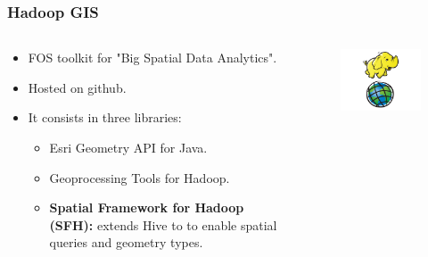\documentclass[hyperref={pdfpagelabels=true}]{beamer}
\begin{document}
\begin{frame}
\frametitle{Hadoop GIS}
\begin{columns}
  \begin{column}{0.5\textwidth}
   \begin{itemize}  
    \item<1->FOS toolkit for "Big Spatial Data Analytics".%
    \item<2->Hosted on github.
    \item<3->It consists in three libraries:
   \begin{itemize}    
      \item<4->Esri Geometry API for Java.
      \item<4->Geoprocessing Tools for Hadoop.
      \item<4->\textbf{Spatial Framework for Hadoop (SFH):} extends Hive to to enable spatial queries and geometry types.%
    \end{itemize} 
   \end{itemize}     
 \end{column}  
  \begin{column}{0.5\textwidth}
    \begin{figure}       
	\includegraphics[width=\textwidth]{gis4hadoop.png}      
     \end{figure}        
 \end{column}  
 \end{columns}  
\end{frame}
\end{document}
